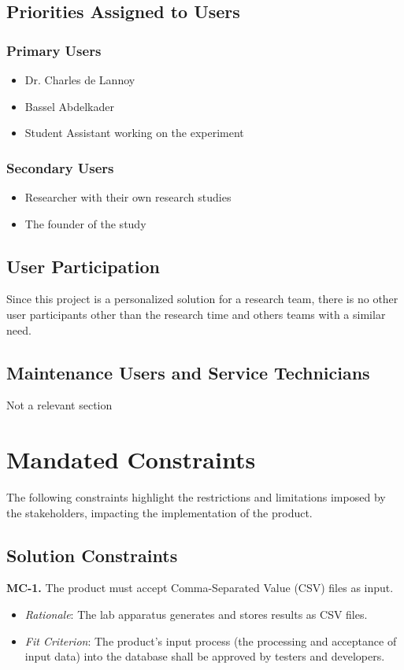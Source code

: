 \documentclass[12pt]{article}
\begin{document}
\subsection{Priorities Assigned to Users}
\subsubsection{Primary Users}
\begin{itemize}
  \item Dr. Charles de Lannoy
  \item Bassel Abdelkader
  \item Student Assistant working on the experiment 
\end{itemize}

\subsubsection{Secondary Users}
\begin{itemize}
  \item Researcher with their own research studies 
  \item The founder of the study
\end{itemize}
\subsection{User Participation}
Since this project is a personalized solution for a research team, there is no
other user participants other than the research time and others teams with a
similar need. 
\subsection{Maintenance Users and Service Technicians}
Not a relevant section 

\section{Mandated Constraints}
The following constraints highlight the restrictions and limitations imposed by the stakeholders, impacting the implementation of the product. 
\subsection{Solution Constraints}
\textbf{MC-1.} The product must accept Comma-Separated Value (CSV) files as input.
\begin{itemize}
  \item \emph{Rationale}: The lab apparatus generates and stores results as CSV files.
  \item \emph{Fit Criterion}: The product's input process (the processing and acceptance of input data) into the database shall be approved by testers and developers.
\end{itemize}
\end{document}
